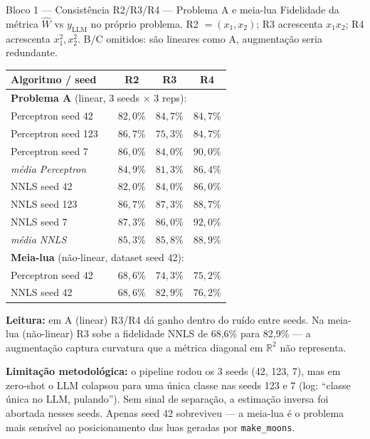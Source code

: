 \documentclass[aspectratio=169,10pt]{beamer}
\begin{document}
\begin{frame}{Bloco 1 --- Consist\^encia R2/R3/R4 --- Problema A e meia-lua}
  \scriptsize
  Fidelidade da m\'etrica $\hat W$ vs $y_{\text{LLM}}$ no pr\'oprio problema. R2 $= (x_1,x_2)$; R3 acrescenta $x_1 x_2$; R4 acrescenta $x_1^2, x_2^2$. B/C omitidos: s\~ao lineares como A, augmenta\c{c}\~ao seria redundante.
  \begin{center}
  \begin{tabular}{llccc}
    \toprule
    Algoritmo / seed & & R2 & R3 & R4 \\
    \midrule
    \multicolumn{5}{l}{\textbf{Problema A} (linear, 3 seeds $\times$ 3 reps):} \\
    Perceptron seed 42  & & $82{,}0\%$ & $84{,}7\%$ & $84{,}7\%$ \\
    Perceptron seed 123 & & $86{,}7\%$ & $75{,}3\%$ & $84{,}7\%$ \\
    Perceptron seed 7   & & $86{,}0\%$ & $84{,}0\%$ & $90{,}0\%$ \\
    \textit{m\'edia Perceptron} & & $84{,}9\%$ & $81{,}3\%$ & $86{,}4\%$ \\
    NNLS seed 42  & & $82{,}0\%$ & $84{,}0\%$ & $86{,}0\%$ \\
    NNLS seed 123 & & $86{,}7\%$ & $87{,}3\%$ & $88{,}7\%$ \\
    NNLS seed 7   & & $87{,}3\%$ & $86{,}0\%$ & $92{,}0\%$ \\
    \textit{m\'edia NNLS} & & $85{,}3\%$ & $85{,}8\%$ & $88{,}9\%$ \\
    \midrule
    \multicolumn{5}{l}{\textbf{Meia-lua} (n\~ao-linear, dataset seed 42):} \\
    Perceptron seed 42 & & $68{,}6\%$ & $74{,}3\%$ & $75{,}2\%$ \\
    NNLS seed 42       & & $68{,}6\%$ & \textbf{$82{,}9\%$} & $76{,}2\%$ \\
    \bottomrule
  \end{tabular}
  \end{center}
  \tiny
  \textbf{Leitura:} em A (linear) R3/R4 d\'a ganho dentro do ru\'ido entre seeds. Na meia-lua (n\~ao-linear) R3 sobe a fidelidade NNLS de 68,6\% para 82,9\% --- a augmenta\c{c}\~ao captura curvatura que a m\'etrica diagonal em $\mathbb{R}^2$ n\~ao representa.

  \textbf{Limita\c{c}\~ao metodol\'ogica:} o pipeline rodou os 3 seeds (42, 123, 7), mas em zero-shot o LLM colapsou para uma \'unica classe nas seeds 123 e 7 (log: ``classe \'unica no LLM, pulando''). Sem sinal de separa\c{c}\~ao, a estima\c{c}\~ao inversa foi abortada nesses seeds. Apenas seed 42 sobreviveu --- a meia-lua \'e o problema mais sens\'ivel ao posicionamento das luas geradas por \texttt{make\_moons}.
\end{frame}
\end{document}
